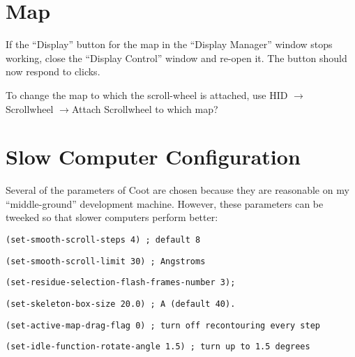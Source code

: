 \documentclass{book}
\begin{document}
\section{Map}
If the ``Display'' button for the map in the ``Display Manager''
window stops working, close the ``Display Control'' window and re-open
it.  The button should now respond to clicks.

To change the map to which the scroll-wheel is attached, use
\textsf{HID $\rightarrow$ Scrollwheel $\rightarrow $Attach Scrollwheel
  to which map?}
 
\section{Slow Computer Configuration}
Several of the parameters of Coot are chosen
because they are reasonable on my ``middle-ground'' development
machine.  However, these parameters can be tweeked so that slower
computers perform better:

\begin{trivlist}
\item \texttt{(set-smooth-scroll-steps 4) ; default 8 }
\item \texttt{(set-smooth-scroll-limit 30) ; Angstroms}
\item \texttt{(set-residue-selection-flash-frames-number 3);}
\item \texttt{(set-skeleton-box-size 20.0) ; A (default 40).}
\item \texttt{(set-active-map-drag-flag 0) ; turn off recontouring every step}
\item \texttt{(set-idle-function-rotate-angle 1.5) ; turn up to 1.5 degrees}
\end{trivlist}





\end{document}
